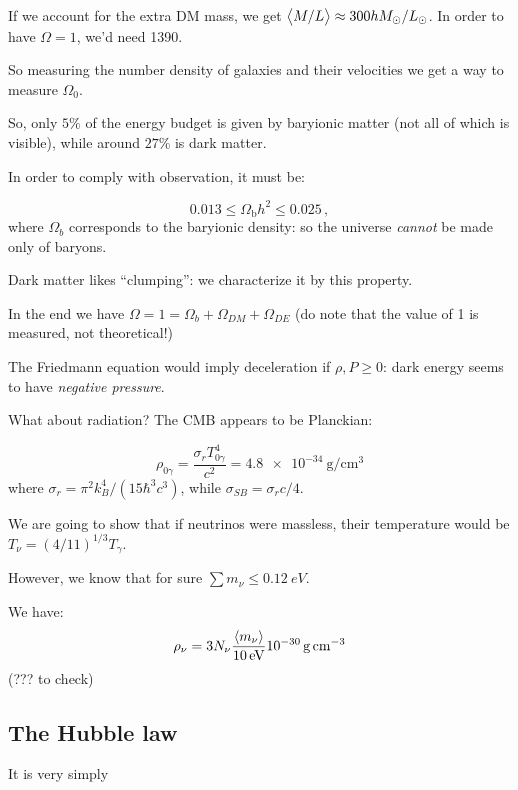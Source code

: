 \documentclass[main.tex]{subfiles}
\begin{document}
If we account for the extra DM mass, we get \(\expval{M/L} \approx 300 h M_\odot / L_\odot\).
In order to have \(\Omega = 1\), we'd need 1390.

So measuring the number density of galaxies and their velocities we get a way to measure \(\Omega_0\).

So, only \(5\%\) of the energy budget is given by baryionic matter (not all of which is visible), while around \(27\%\) is dark matter.

In order to comply with observation, it must be:

\begin{equation}
  0.013 \leq \Omega_{\text{b}} h^2 \leq 0.025\,,
\end{equation}
%
where \(\Omega_b\) corresponds to the baryionic density: so the universe \emph{cannot} be made only of baryons.

Dark matter likes ``clumping'': we characterize it by this property.

In the end we have \(\Omega = 1 = \Omega_b + \Omega_{DM} + \Omega_{DE}\) (do note that the value of 1 is measured, not theoretical!)

The Friedmann equation would imply deceleration if \(\rho, P \geq 0\): dark energy seems to have \emph{negative pressure}.

What about radiation? The CMB appears to be Planckian:

\begin{equation}
  \rho_{0 \gamma} = \frac{\sigma_r T_{0 \gamma}^4}{c^2} = \SI{4.8e-34}{\gram\per\centi\metre\cubed}
\end{equation}
%
where \(\sigma_r = \pi^2 k_B^4 / (15 \hbar ^3 c^3)\), while \(\sigma_{SB} = \sigma_r c /4\).

We are going to show that if neutrinos were massless, their temperature would be \(T_\nu = (4/11)^{1/3} T_\gamma\).

However, we know that for sure \(\sum m_\nu \leq \SI{0.12}{eV} \).

We have:
%
\begin{equation}
  \rho_\nu = 3 N_\nu \frac{\expval{m_\nu} }{\SI{10}{eV}} \SI{e-30}{\gram\per\cubic\centi\metre}
\end{equation}
(??? to check)

\subsection{The Hubble law}

It is very simply
\end{document}
